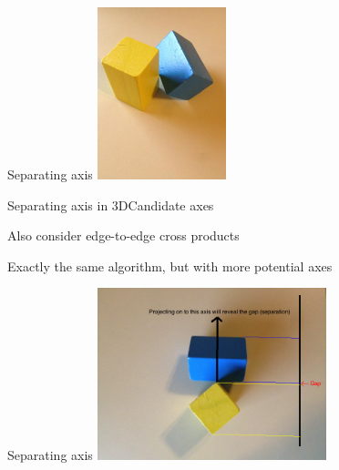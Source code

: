 \documentclass{beamer}
\begin{document}
\begin{frame}{Separating axis}
\center
\includegraphics[height=5cm]{Pics/EdgeToEdgeCross.png}
\end{frame}

\begin{slide}{Separating axis in 3D}{Candidate axes}{
\item Also consider edge-to-edge cross products
\item Exactly the same algorithm, but with more potential axes
}\end{slide}

\begin{frame}{Separating axis}
\center
\includegraphics[height=5cm]{Pics/EdgeToEdgeCross2.png}
\end{frame}
\end{document}
